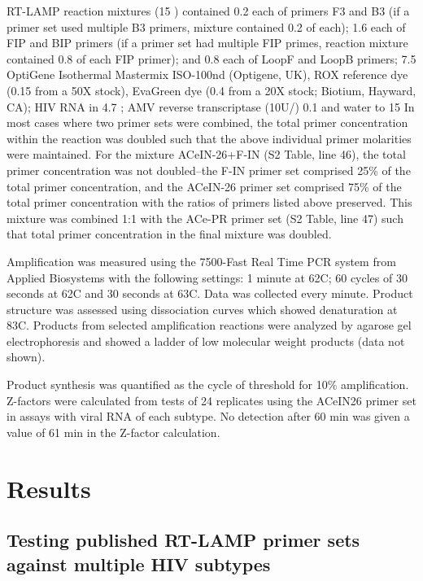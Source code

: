 \documentclass[../sherrill-Mix_thesis.tex]{subfiles}
\begin{document}
	RT-LAMP reaction mixtures (15 \uL{}) contained 0.2 \uM{} each of primers F3 and B3 (if a primer set used multiple B3 primers, mixture contained 0.2 \uM{} of each); 1.6 \uM{} each of FIP and BIP primers (if a primer set had multiple FIP primes, reaction mixture contained 0.8 \uM{} of each FIP primer); and 0.8 \uM{} each of LoopF and LoopB primers; 7.5 \uL{} OptiGene Isothermal Mastermix ISO-100nd (Optigene, UK), ROX reference dye (0.15 \uL{} from a 50X stock), EvaGreen dye (0.4 \uL{} from a 20X stock; Biotium, Hayward, CA); HIV RNA in 4.7 \uL{}; AMV reverse transcriptase (10U/\uL{}) 0.1 \uL{} and water to 15 \uL{} In most cases where two primer sets were combined, the total primer concentration within the reaction was doubled such that the above individual primer molarities were maintained. For the mixture ACeIN-26+F-IN (S2 Table, line 46), the total primer concentration was not doubled--the F-IN primer set comprised 25\% of the total primer concentration, and the ACeIN-26 primer set comprised 75\% of the total primer concentration with the ratios of primers listed above preserved. This mixture was combined 1:1 with the ACe-PR primer set (S2 Table, line 47) such that total primer concentration in the final mixture was doubled.

	Amplification was measured using the 7500-Fast Real Time PCR system from Applied Biosystems with the following settings: 1 minute at 62\degree{}C; 60 cycles of 30 seconds at 62\degree{}C and 30 seconds at 63\degree{}C. Data was collected every minute. Product structure was assessed using dissociation curves which showed denaturation at 83\degree{}C. Products from selected amplification reactions were analyzed by agarose gel electrophoresis and showed a ladder of low molecular weight products (data not shown).

	Product synthesis was quantified as the cycle of threshold for 10\% amplification. Z-factors \citep{Zhang1999} were calculated from tests of 24 replicates using the ACeIN26 primer set in assays with viral RNA of each subtype. No detection after 60 min was given a value of 61 min in the Z-factor calculation.


\section{Results}
	\subsection{Testing published RT-LAMP primer sets against multiple HIV subtypes}
\end{document}
